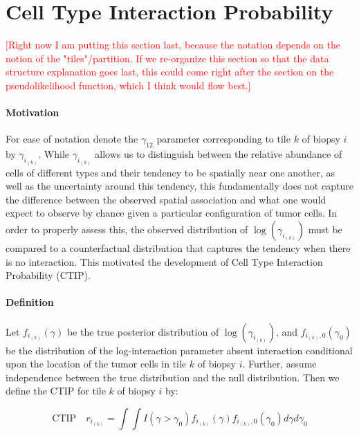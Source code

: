 \documentclass[
]{book}
\begin{document}
\hypertarget{cell-type-interaction-probability}{%
\section{Cell Type Interaction Probability}\label{cell-type-interaction-probability}}

\textcolor{red}{\textsf{[Right now I am putting this section last, because the notation depends on the notion of the "tiles"/partition. If we re-organize this section so that the data structure explanation goes last, this could come right after the section on the pseudolikelihood function, which I think would flow best.]}}

\paragraph{\textbf{Motivation}}

For ease of notation denote the \(\gamma_{12}\) parameter
corresponding to tile \(k\) of biopsy \(i\) by \(\gamma_{i_{(k)}}\). While
\(\gamma_{i_{(k)}}\) allows us to distinguish between the relative
abundance of cells of different types and their tendency to
be spatially near one another, as well as the uncertainty
around this tendency, this fundamentally does not capture
the difference between the observed spatial association
and what one would expect to observe by chance given a
particular configuration of tumor cells. In order to properly
assess this, the observed distribution of \(\log(\gamma_{i_{(k)}})\)
must be compared to a counterfactual distribution that captures
the tendency when there is no interaction. This motivated
the development of Cell Type Interaction Probability (CTIP).

\paragraph{\textbf{Definition}}

Let \(f_{i_{(k)}}(\gamma)\) be the true posterior distribution of \(\log(\gamma_{i_{(k)}})\), and \(f_{i_{(k)},0}(\gamma_0)\) be the distribution of the log-interaction parameter absent interaction conditional upon the location of the tumor cells in tile \(k\) of biopsy \(i\). Further, assume independence between the true distribution and the null distribution. Then we define the CTIP for tile \(k\) of biopsy \(i\) by:

\begin{equation}
\label{eqn:CTIP}
\text{CTIP} \quad r_{i_{(k)}} = \int \int  I(\gamma > \gamma_0) f_{i_{(k)}}(\gamma) f_{i_{(k)},0}(\gamma_0)  d\gamma d\gamma_0 
\tag{5}
\end{equation}
\end{document}
